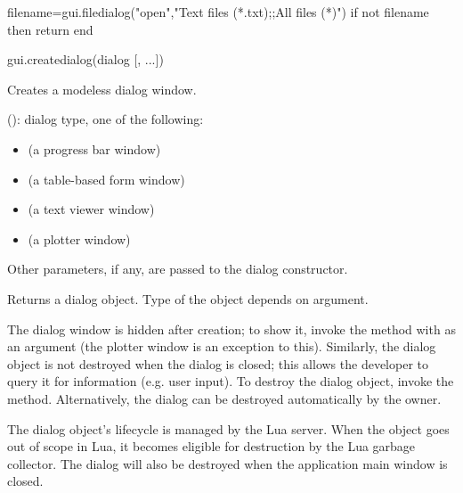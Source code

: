\documentclass[a4paper,12pt,twoside,extrafontsizes]{memoir}
\begin{document}
\begin{funcexamples}
\begin{shellcmds}\begin{luacode}
filename=gui.filedialog("open","Text files (*.txt);;All files (*)")
if not filename then return end
\end{luacode}\end{shellcmds}
\end{funcexamples}


\begin{luafuncprototype}
gui.createdialog(dialog [, ...])
\end{luafuncprototype}

\begin{funcdescr}
	Creates a modeless dialog window.
\end{funcdescr}

\begin{funcparams}
	 (): dialog type, one of the following:
	\begin{itemize}
		\item {} (a progress bar window)
		\item {} (a table-based form window)
		\item {} (a text viewer window)
		\item {} (a plotter window)
	\end{itemize}
	\item Other parameters, if any, are passed to the dialog constructor.
\end{funcparams}

\begin{funcret}
	Returns a dialog object. Type of the object depends on  argument.
\end{funcret}

\begin{funcremarks}
	The dialog window is hidden after creation; to show it, invoke the  method with  as an argument (the plotter window is an exception to this). Similarly, the dialog object is not destroyed when the dialog is closed; this allows the developer to query it for information (e.g. user input). To destroy the dialog object, invoke the  method. Alternatively, the dialog can be destroyed automatically by the owner.
	
	The dialog object's lifecycle is managed by the Lua server. When the object goes out of scope in Lua, it becomes eligible for destruction by the Lua garbage collector. The dialog will also be destroyed when the application main window is closed.
\end{funcremarks}
\end{document}
